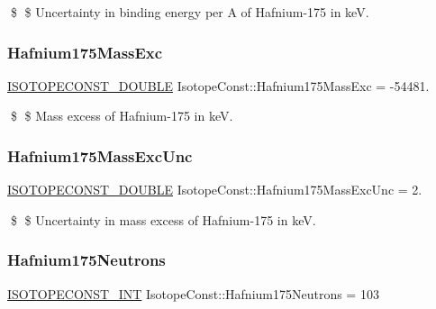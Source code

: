 \$ \$ Uncertainty in binding energy per A of Hafnium-\/175 in keV. \mbox{\label{group___isotope_const-_hafnium-_hf175_ga2566d545228b95e26ab69b3d80675e21}} 
\subsubsection{\texorpdfstring{Hafnium175\+Mass\+Exc}{Hafnium175MassExc}}
{\footnotesize\ttfamily \mbox{\hyperlink{group___isotope_const-_macros_ga8f45a7272ce02c0b4c65c44636ed719a}{I\+S\+O\+T\+O\+P\+E\+C\+O\+N\+S\+T\+\_\+\+D\+O\+U\+B\+LE}} Isotope\+Const\+::\+Hafnium175\+Mass\+Exc = -\/54481.}

\$ \$ Mass excess of Hafnium-\/175 in keV. \mbox{\label{group___isotope_const-_hafnium-_hf175_ga7fca27c342b440f1838744d4b1dab2f0}} 
\subsubsection{\texorpdfstring{Hafnium175\+Mass\+Exc\+Unc}{Hafnium175MassExcUnc}}
{\footnotesize\ttfamily \mbox{\hyperlink{group___isotope_const-_macros_ga8f45a7272ce02c0b4c65c44636ed719a}{I\+S\+O\+T\+O\+P\+E\+C\+O\+N\+S\+T\+\_\+\+D\+O\+U\+B\+LE}} Isotope\+Const\+::\+Hafnium175\+Mass\+Exc\+Unc = 2.}

\$ \$ Uncertainty in mass excess of Hafnium-\/175 in keV. \mbox{\label{group___isotope_const-_hafnium-_hf175_ga3a0d27dcbef40b07f9a3865d6d050e48}} 
\subsubsection{\texorpdfstring{Hafnium175\+Neutrons}{Hafnium175Neutrons}}
{\footnotesize\ttfamily \mbox{\hyperlink{group___isotope_const-_macros_ga5f18360b3e99483a35c32d789e62621c}{I\+S\+O\+T\+O\+P\+E\+C\+O\+N\+S\+T\+\_\+\+I\+NT}} Isotope\+Const\+::\+Hafnium175\+Neutrons = 103}

